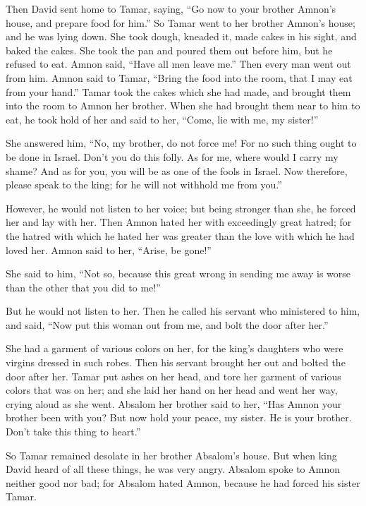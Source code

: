  Then David sent home to Tamar, saying, ``Go now to your
brother Amnon's house, and prepare food for him.''  So
Tamar went to her brother Amnon's house; and he was lying down. She took
dough, kneaded it, made cakes in his sight, and baked the cakes.
 She took the pan and poured them out before him, but he
refused to eat. Amnon said, ``Have all men leave me.'' Then every man
went out from him.  Amnon said to Tamar, ``Bring the food
into the room, that I may eat from your hand.'' Tamar took the cakes
which she had made, and brought them into the room to Amnon her brother.
 When she had brought them near to him to eat, he took
hold of her and said to her, ``Come, lie with me, my sister!''

 She answered him, ``No, my brother, do not force me! For
no such thing ought to be done in Israel. Don't you do this folly.
 As for me, where would I carry my shame? And as for you,
you will be as one of the fools in Israel. Now therefore, please speak
to the king; for he will not withhold me from you.''

 However, he would not listen to her voice; but being
stronger than she, he forced her and lay with her.  Then
Amnon hated her with exceedingly great hatred; for the hatred with which
he hated her was greater than the love with which he had loved her.
Amnon said to her, ``Arise, be gone!''

 She said to him, ``Not so, because this great wrong in
sending me away is worse than the other that you did to me!''

But he would not listen to her.  Then he called his
servant who ministered to him, and said, ``Now put this woman out from
me, and bolt the door after her.''

 She had a garment of various colors on her, for the
king's daughters who were virgins dressed in such robes. Then his
servant brought her out and bolted the door after her. 
Tamar put ashes on her head, and tore her garment of various colors that
was on her; and she laid her hand on her head and went her way, crying
aloud as she went.  Absalom her brother said to her,
``Has Amnon your brother been with you? But now hold your peace, my
sister. He is your brother. Don't take this thing to heart.''

So Tamar remained desolate in her brother Absalom's house.
 But when king David heard of all these things, he was
very angry.  Absalom spoke to Amnon neither good nor bad;
for Absalom hated Amnon, because he had forced his sister Tamar.

